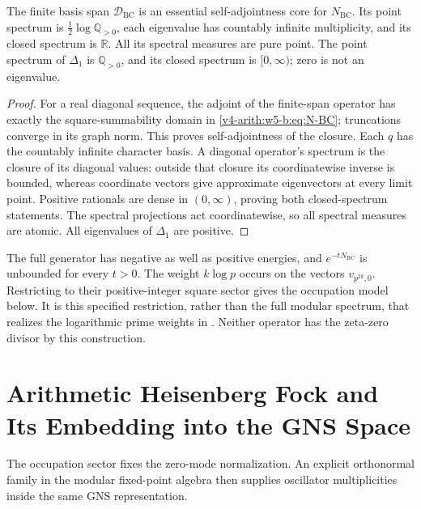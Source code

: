\begin{theorem}
\label{v4-arith:w5-b:thm:N-BC-self-adjoint}
The finite basis span $\mathcal D_{\mathrm{BC}}$ is an essential
self-adjointness core for $N_{\mathrm{BC}}$. Its point spectrum is
$\tfrac12\log\mathbb Q_{>0}$, each eigenvalue has countably infinite
multiplicity, and its closed spectrum is $\mathbb R$. All its spectral
measures are pure point. The point spectrum of $\Delta_1$ is
$\mathbb Q_{>0}$, and its closed spectrum is $[0,\infty)$;
zero is not an eigenvalue.
\end{theorem}
\begin{proof}
For a real diagonal sequence, the adjoint of the finite-span operator
has exactly the square-summability domain in
\eqref{v4-arith:w5-b:eq:N-BC}; truncations converge in its graph norm.
This proves self-adjointness of the closure. Each $q$ has the
countably infinite character basis. A diagonal operator's spectrum
is the closure of its diagonal values: outside that closure its
coordinatewise inverse is bounded, whereas coordinate vectors give
approximate eigenvectors at every limit point. Positive rationals
are dense in $(0,\infty)$, proving both closed-spectrum statements.
The spectral projections act coordinatewise, so all spectral
measures are atomic. All eigenvalues of $\Delta_1$ are positive.
\end{proof}

\begin{remark}
\label{v4-arith:w5-b:rem:N-BC-not}
The full generator has negative as well as positive energies, and
$e^{-tN_{\mathrm{BC}}}$ is unbounded for every $t>0$.
The weight $k\log p$ occurs on the vectors $v_{p^{2k},0}$.
Restricting to their positive-integer square sector gives the
occupation model below. It is this specified restriction, rather
than the full modular spectrum, that realizes the logarithmic
prime weights in .
Neither operator has the zeta-zero divisor by this construction.
\end{remark}
\section{Arithmetic Heisenberg Fock and Its Embedding into the GNS Space}
\label{v4-arith:w5-b:primary-heisenberg}

The occupation sector fixes the zero-mode normalization. An explicit
orthonormal family in the modular fixed-point algebra then supplies
oscillator multiplicities inside the same GNS representation.

